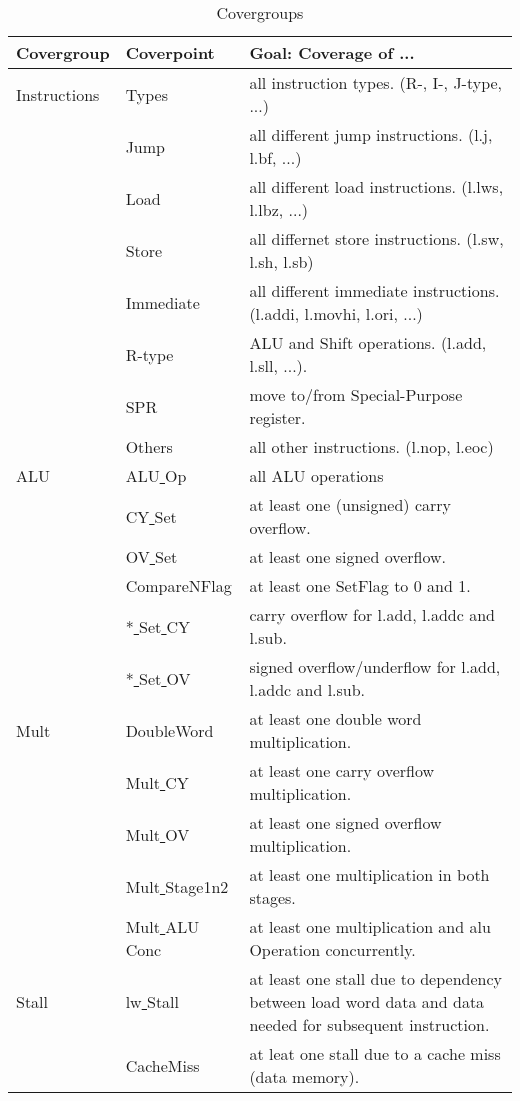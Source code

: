 \begin{table}[htbp]
 \caption{Covergroups}
 \label{tab:covergroups}
 \centering\begin{tabular}{l l p{8cm}} \hline
Covergroup & Coverpoint & Goal: Coverage of ... \\ \hline
Instructions& Types & all instruction types. (R-, I-, J-type, ...) \\
 & Jump & all different jump instructions. (l.j, l.bf, ...) \\
 & Load & all different load instructions. (l.lws, l.lbz, ...)\\
 & Store & all differnet store instructions. (l.sw, l.sh, l.sb) \\
 & Immediate & all different immediate instructions. (l.addi, l.movhi, l.ori, ...) \\
 & R-type & ALU and Shift operations. (l.add, l.sll, ...). \\
 & SPR & move to/from Special-Purpose register. \\
 & Others & all other instructions. (l.nop, l.eoc) \\ \hline
ALU & ALU\underline{ }Op & all ALU operations \\ 
 & CY\underline{ }Set & at least one (unsigned) carry overflow. \\
  & OV\underline{ }Set & at least one signed overflow. \\
  & CompareNFlag & at least one SetFlag to 0 and 1. \\
  & *\underline{ }Set\underline{ }CY & carry overflow for l.add, l.addc and l.sub. \\
  & *\underline{ }Set\underline{ }OV & signed overflow/underflow for l.add, l.addc and l.sub. \\ \hline
Mult & DoubleWord & at least one double word multiplication. \\ 
 & Mult\underline{ }CY & at least one carry overflow multiplication. \\
 & Mult\underline{ }OV & at least one signed overflow multiplication. \\
 & Mult\underline{ }Stage1n2 & at least one multiplication in both stages.\\
 & Mult\underline{ }ALU\underline{ }Conc & at least one multiplication and \gls{alu} Operation concurrently. \\ \hline
 Stall & lw\underline{ }Stall & at least one stall due to dependency between load word data and data needed for subsequent instruction. \\ 
  & CacheMiss & at leat one stall due to a cache miss (data memory). \\

\end{tabular}
\end{table}
